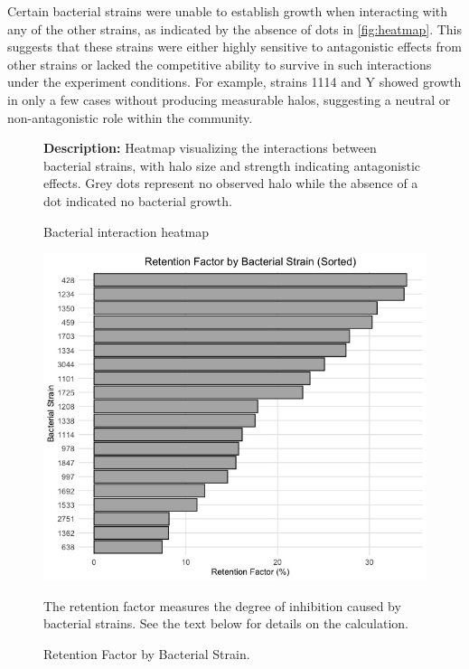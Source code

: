 Certain bacterial strains were unable to establish growth when interacting with any of the other strains, as indicated by the absence of dots in \autoref{fig:heatmap}. This suggests that these strains were either highly sensitive to antagonistic effects from other strains or lacked the competitive ability to survive in such interactions under the experiment conditions. 
For example, strains 1114 and Y showed growth in only a few cases without producing measurable halos, suggesting a neutral or non-antagonistic role within the community.
\begin{figure}[H]
    \centering
    \raggedright
    
    \caption{Bacterial interaction heatmap}
    \medskip
    \textbf{Description:} Heatmap visualizing the interactions between bacterial strains, with halo size and strength indicating antagonistic effects. Grey dots represent no observed halo while the absence of a dot indicated no bacterial growth.
    \label{fig:heatmap}
\end{figure}

\begin{figure}[H]
    \centering
    \includegraphics[width=\linewidth]{Figures/RetentionFactor.jpeg}
    \caption{Retention Factor by Bacterial Strain.}
    The retention factor measures the degree of inhibition caused by bacterial strains. 
    See the text below for details on the calculation.
    \label{fig:retention}
\end{figure}

